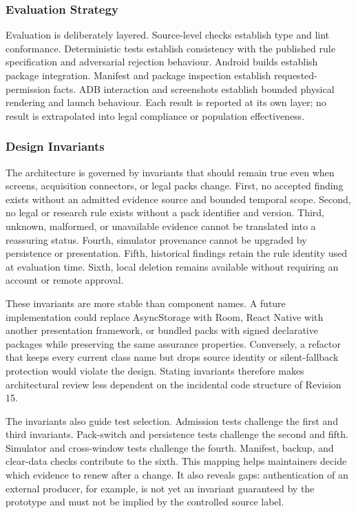 \subsubsection{Evaluation Strategy}

Evaluation is deliberately layered. Source-level checks establish type and lint conformance. Deterministic tests establish consistency with the published rule specification and adversarial rejection behaviour. Android builds establish package integration. Manifest and package inspection establish requested-permission facts. ADB interaction and screenshots establish bounded physical rendering and launch behaviour. Each result is reported at its own layer; no result is extrapolated into legal compliance or population effectiveness.

\subsubsection{Design Invariants}

The architecture is governed by invariants that should remain true even when screens, acquisition connectors, or legal packs change. First, no accepted finding exists without an admitted evidence source and bounded temporal scope. Second, no legal or research rule exists without a pack identifier and version. Third, unknown, malformed, or unavailable evidence cannot be translated into a reassuring status. Fourth, simulator provenance cannot be upgraded by persistence or presentation. Fifth, historical findings retain the rule identity used at evaluation time. Sixth, local deletion remains available without requiring an account or remote approval.

These invariants are more stable than component names. A future implementation could replace AsyncStorage with Room, React Native with another presentation framework, or bundled packs with signed declarative packages while preserving the same assurance properties. Conversely, a refactor that keeps every current class name but drops source identity or silent-fallback protection would violate the design. Stating invariants therefore makes architectural review less dependent on the incidental code structure of Revision 15.

The invariants also guide test selection. Admission tests challenge the first and third invariants. Pack-switch and persistence tests challenge the second and fifth. Simulator and cross-window tests challenge the fourth. Manifest, backup, and clear-data checks contribute to the sixth. This mapping helps maintainers decide which evidence to renew after a change. It also reveals gaps: authentication of an external producer, for example, is not yet an invariant guaranteed by the prototype and must not be implied by the controlled source label.

